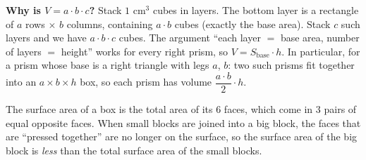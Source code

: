 \begin{proofbox}
\textbf{Why is $V=a\cdot b\cdot c$?} Stack $1\text{ cm}^3$ cubes in layers. The bottom layer is a rectangle of $a$ rows $\times$ $b$ columns, containing $a\cdot b$ cubes (exactly the base area). Stack $c$ such layers and we have $a\cdot b\cdot c$ cubes. The argument ``each layer $=$ base area, number of layers $=$ height'' works for every right prism, so $V=S_{\text{base}}\cdot h$. In particular, for a prism whose base is a right triangle with legs $a$, $b$: two such prisms fit together into an $a\times b\times h$ box, so each prism has volume $\dfrac{a\cdot b}{2}\cdot h$.
\end{proofbox}

\begin{tipbox}
The surface area of a box is the total area of its $6$ faces, which come in $3$ pairs of equal opposite faces. When small blocks are joined into a big block, the faces that are ``pressed together'' are no longer on the surface, so the surface area of the big block is \emph{less} than the total surface area of the small blocks.
\end{tipbox}

